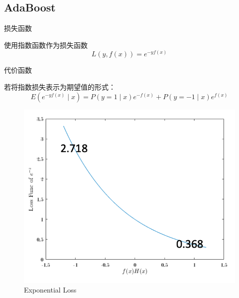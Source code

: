 \subsection{AdaBoost}
\begin{outline}
	\1 损失函数

	使用指数函数作为损失函数
	\begin{equation}\label{loss:16}
		L(y, f(x))=e^{-y f(x)}
	 \end{equation}



	\1 代价函数

	若将指数损失表示为期望值的形式：
	\begin{equation}
		E\left(e^{-y f(x)} \mid x\right)=P(y=1 \mid x) e^{-f(x)}+P(y=-1 \mid x) e^{f(x)}
	\end{equation}
	\begin{figure}[h]%
		\centering
		\includegraphics[scale=0.8]{figs/5.png} 
		\caption{Exponential Loss}
		\label{fig:Exponential}
	 \end{figure}

\end{outline}
